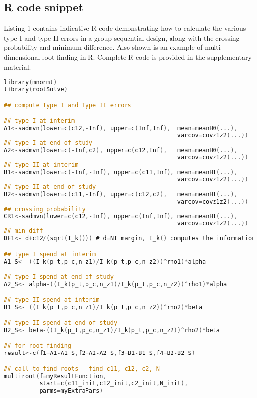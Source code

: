 \documentclass{article}
\begin{document}
\subsection{R code snippet}
Listing 1 contains indicative R code demonstrating how to calculate the various type I and type II errors in a group sequential design, along with the crossing probability and minimum difference. Also shown is an example of multi-dimensional root finding in R. Complete R code is provided in the supplementary material.   

\begin{lstlisting}[language=C,float,caption={R code snippet for error spending and root finding. Parameter names have been chosen to match those in the main text.}]
library(mnormt)
library(rootSolve)

## compute Type I and Type II errors

## type I at interim
A1<-sadmvn(lower=c(c12,-Inf), upper=c(Inf,Inf),  mean=meanH0(...), 
                                                 varcov=covz1z2(...))
## type I at end of study 
A2<-sadmvn(lower=c(-Inf,c2), upper=c(c12,Inf),   mean=meanH0(...), 
                                                 varcov=covz1z2(...))
## type II at interim
B1<-sadmvn(lower=c(-Inf,-Inf), upper=c(c11,Inf), mean=meanH1(...), 
                                                 varcov=covz1z2(...))
## type II at end of study 
B2<-sadmvn(lower=c(c11,-Inf), upper=c(c12,c2),   mean=meanH1(...), 
                                                 varcov=covz1z2(...))
## crossing probability
CR1<-sadmvn(lower=c(c12,-Inf), upper=c(Inf,Inf), mean=meanH1(...), 
                                                 varcov=covz1z2(...))
## min diff
DF1<- d+c12/(sqrt(I_k())) # d=NI margin, I_k() computes the information

## type I spend at interim
A1_S<- ((I_k(p_t,p_c,n_z1)/I_k(p_t,p_c,n_z2))^rho1)*alpha

## type I spend at end of study  
A2_S<- alpha-((I_k(p_t,p_c,n_z1)/I_k(p_t,p_c,n_z2))^rho1)*alpha

## type II spend at interim  
B1_S<- ((I_k(p_t,p_c,n_z1)/I_k(p_t,p_c,n_z2))^rho2)*beta

## type II spend at end of study  
B2_S<- beta-((I_k(p_t,p_c,n_z1)/I_k(p_t,p_c,n_z2))^rho2)*beta

## for root finding 
result<-c(f1=A1-A1_S,f2=A2-A2_S,f3=B1-B1_S,f4=B2-B2_S)

## call to find roots - find c11, c12, c2, N
multiroot(f=myResultFunction,
          start=c(c11_init,c12_init,c2_init,N_init),
          parms=myExtraPars)

\end{lstlisting}
\end{document}
